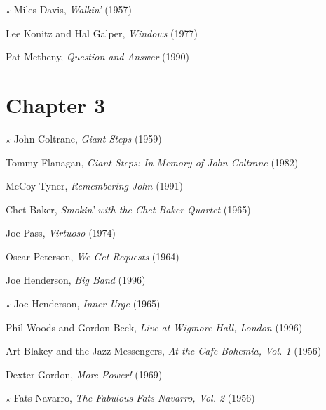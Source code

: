 \begin{compactitem}
    \item[$\star$] Miles Davis, \emph{Walkin'} (1957)
    \item Lee Konitz and Hal Galper, \emph{Windows} (1977)
    \item Pat Metheny, \emph{Question and Answer} (1990)
\end{compactitem}
\nocite{davis:walkin,konitz:windows,metheny:qa}

\section*{Chapter 3}

\vspace{-1em}
\begin{compactitem}
    \item[$\star$] John Coltrane, \emph{Giant Steps} (1959)
    \item Tommy Flanagan, \emph{Giant Steps: In Memory of John Coltrane} (1982)
    \item McCoy Tyner, \emph{Remembering John} (1991)
\end{compactitem}
\nocite{coltrane:giantsteps,flanagan:giantsteps,tyner:remembering}

\begin{compactitem}
    \item Chet Baker, \emph{Smokin' with the Chet Baker Quartet} (1965)
    \item Joe Pass, \emph{Virtuoso} (1974)
    \item Oscar Peterson, \emph{We Get Requests} (1964)
\end{compactitem}
\nocite{baker:smokin,pass:virtuoso,peterson:requests}


\begin{compactitem}
    \item Joe Henderson, \emph{Big Band} (1996)
    \item[$\star$] Joe Henderson, \emph{Inner Urge} (1965)
    \item Phil Woods and Gordon Beck, \emph{Live at Wigmore Hall, London} (1996)
\end{compactitem}
\nocite{henderson:bigband,henderson:isotope,woods:wigmore}

\begin{compactitem}
    \item Art Blakey and the Jazz Messengers, \emph{At the Cafe Bohemia,
        Vol. 1} (1956)
    \item Dexter Gordon, \emph{More Power!} (1969)
    \item[$\star$] Fats Navarro, \emph{The Fabulous Fats Navarro, Vol. 2} (1956)
\end{compactitem}
\nocite{blakey:bohemia,gordon:power,navarro:fabulous}


